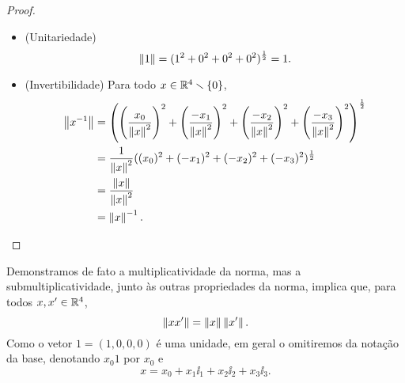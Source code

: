 \begin{proof}
\begin{itemize}
	\item (Unitariedade)
		\begin{equation*}
		\left\Vert{1}\right\Vert = (1^2+0^2+0^2+0^2)^{\frac{1}{2}} = 1.
		\end{equation*}

	\item (Invertibilidade) Para todo $x \in \mathbb{R}^4 \smallsetminus \{0\}$,
		\begin{align*}
		\left\Vert{x^{-1}}\right\Vert &= \left(\left(\frac{x_0}{\left\Vert{x}\right\Vert^2}\right)^2 + \left(\frac{-x_1}{\left\Vert{x}\right\Vert^2}\right)^2 + \left(\frac{-x_2}{\left\Vert{x}\right\Vert^2}\right)^2 + \left(\frac{-x_3}{\left\Vert{x}\right\Vert^2}\right)^2\right)^{\frac{1}{2}} \\
			&= \frac{1}{\left\Vert{x}\right\Vert^2}((x_0)^2+(-x_1)^2+(-x_2)^2+(-x_3)^2)^{\frac{1}{2}} \\
			&= \frac{\left\Vert{x}\right\Vert}{\left\Vert{x}\right\Vert^2} \\
			&= \left\Vert{x}\right\Vert^{-1}.
			\qedhere
		\end{align*}
\end{itemize}
\end{proof}
\endgroup

Demonstramos de fato a multiplicatividade da norma, mas a submultiplicatividade, junto às outras propriedades da norma, implica que, para todos $x,x' \in \mathbb{R}^4$,
	\begin{equation*}
	\left\Vert{xx'}\right\Vert = \left\Vert{x}\right\Vert\left\Vert{x'}\right\Vert.
	\end{equation*}
Como o vetor $1 = (1,0,0,0)$ é uma unidade, em geral o omitiremos da notação da base, denotando $x_0 1$ por $x_0$ e
	\begin{equation*}
	x = x_0 + x_1 \ii_1 + x_2 \ii_2 + x_3 \ii_3.
	\end{equation*}

